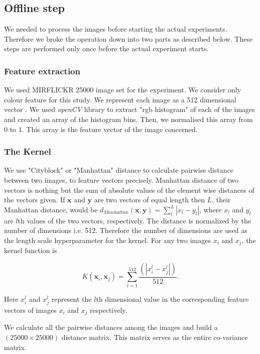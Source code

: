 \documentclass[english]{tktltiki}
\begin{document}
\subsection{Offline step}

We needed to process the images before starting the actual experiments. Therefore we broke the operation down into two parts as described below. These steps are performed only once before the actual experiment starts.

\subsubsection{Feature extraction}

We used MIRFLICKR 25000 \cite{mirflickr} image set for the experiment. We consider only colour feature for this study. We represent each image as a 512 dimensional vector \cite{imse}. We used \textit{openCV} library to extract "rgb histogram" of each of the images and created an array of the histogram bins. Then, we normalised this array from $0$ to $1$. This array is the feature vector of the image concerned.
\subsubsection{The Kernel}

We use "Cityblock" or "Manhattan" distance to calculate pairwise distance between two images, to feature vectors precisely. Manhattan distance of two vectors is nothing but the sum of absolute values of the element wise distances of the vectors given. If $\mathbf{x}$ and $\mathbf{y}$ are two vectors of equal length then $L$, their Manhattan distance, would be $d_{Manhattan}(\mathbf{x}, \mathbf{y}) = \sum \limits_l^L |x_l - y_l|$, where $x_l$ and $y_l$ are $l$th values of the two vectors, respectively. The distance is normalized by the number of dimensions i.e. 512. Therefore the number of dimensions are used as the length scale hyperparameter for the kernel. For any two images $x_i$ and $x_j$, the kernel function is

\begin{equation}
K(\mathbf{x}_i, \mathbf{x}_j) = \sum_{l = 1}^{512}\frac{(|x_i^l - x_j^l|)} {512}.
\end{equation}

Here $x_i^l$ and $x_j^l$ represent the $l$th dimensional value in the corresponding feature vectors of images $x_i$ and $x_j$ respectively.


We calculate all the pairwise distances among the images and build a $(25000 \times 25000)$ distance matrix. This matrix serves as the entire co-variance matrix.
\end{document}
